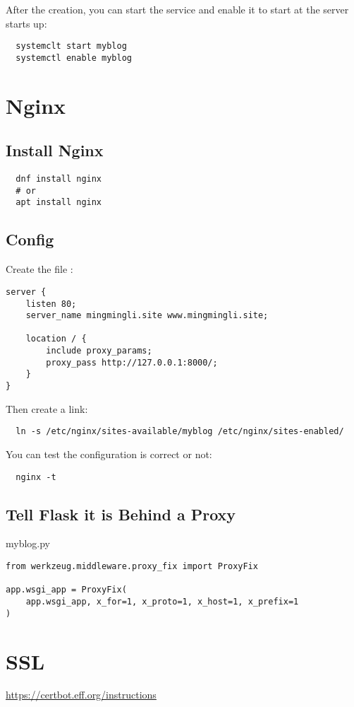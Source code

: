 After the creation, you can start the service and enable it to start at the server starts up:
\begin{lstlisting}
  systemclt start myblog
  systemctl enable myblog
\end{lstlisting}



\section{Nginx}
\label{sec:nginx}


\subsection{Install Nginx}
\label{sec:install-nginx}

\begin{lstlisting}
  dnf install nginx
  # or
  apt install nginx
\end{lstlisting}

\subsection{Config}
\label{sec:config}

Create the file :
\begin{lstlisting}
server {
    listen 80;
    server_name mingmingli.site www.mingmingli.site;

    location / {
        include proxy_params;       
        proxy_pass http://127.0.0.1:8000/;
    }
}  
\end{lstlisting}

Then create a link:
\begin{lstlisting}
  ln -s /etc/nginx/sites-available/myblog /etc/nginx/sites-enabled/
\end{lstlisting}

You can test the configuration is correct or not:
\begin{lstlisting}
  nginx -t
\end{lstlisting}

\subsection{Tell Flask it is Behind a Proxy}

myblog.py
\begin{lstlisting}
from werkzeug.middleware.proxy_fix import ProxyFix

app.wsgi_app = ProxyFix(
    app.wsgi_app, x_for=1, x_proto=1, x_host=1, x_prefix=1
)  
\end{lstlisting}


\section{SSL}
\label{sec:ssl}

\url{https://certbot.eff.org/instructions}


